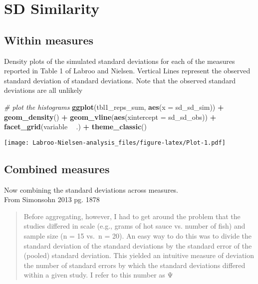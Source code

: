 \documentclass[]{article}
\newenvironment{Shaded}{\begin{snugshade}}{\end{snugshade}}
\newcommand{\CommentTok}[1]{\textcolor[rgb]{0.56,0.35,0.01}{\textit{#1}}}
\newcommand{\DataTypeTok}[1]{\textcolor[rgb]{0.13,0.29,0.53}{#1}}
\newcommand{\KeywordTok}[1]{\textcolor[rgb]{0.13,0.29,0.53}{\textbf{#1}}}
\newcommand{\NormalTok}[1]{#1}
\newcommand{\OperatorTok}[1]{\textcolor[rgb]{0.81,0.36,0.00}{\textbf{#1}}}
\newcommand{\StringTok}[1]{\textcolor[rgb]{0.31,0.60,0.02}{#1}}
\begin{document}
\hypertarget{sd-similarity}{%
\section{SD Similarity}\label{sd-similarity}}

\hypertarget{within-measures}{%
\subsection{Within measures}\label{within-measures}}

Density plots of the simulated standard deviations for each of the
measures reported in Table 1 of Labroo and Nielsen. Vertical Lines
represent the observed standard deviation of standard deviations. Note
that the observed standard deviations are all unlikely

\begin{Shaded}
\begin{Highlighting}[]
\CommentTok{# plot the histograms}
\KeywordTok{ggplot}\NormalTok{(tbl1_reps_sum, }\KeywordTok{aes}\NormalTok{(}\DataTypeTok{x =}\NormalTok{ sd_sd_sim)) }\OperatorTok{+}
\StringTok{  }\KeywordTok{geom_density}\NormalTok{() }\OperatorTok{+}
\StringTok{  }\KeywordTok{geom_vline}\NormalTok{(}\KeywordTok{aes}\NormalTok{(}\DataTypeTok{xintercept =}\NormalTok{ sd_sd_obs)) }\OperatorTok{+}
\StringTok{  }\KeywordTok{facet_grid}\NormalTok{(variable }\OperatorTok{~}\StringTok{ }\NormalTok{.) }\OperatorTok{+}
\StringTok{  }\KeywordTok{theme_classic}\NormalTok{()}
\end{Highlighting}
\end{Shaded}

\texttt{[image: Labroo-Nielsen-analysis\_files/figure-latex/Plot-1.pdf]}

\hypertarget{combined-measures}{%
\subsection{Combined measures}\label{combined-measures}}

Now combining the standard deviations across measures.\\
From Simonsohn 2013 pg. 1878

\begin{quote}
Before aggregating, however, I had to get around the problem that the
studies differed in scale (e.g., grams of hot sauce vs. number of fish)
and sample size (n = 15 vs.~n = 20). An easy way to do this was to
divide the standard deviation of the standard deviations by the standard
error of the (pooled) standard deviation. This yielded an intuitive
measure of deviation the number of standard errors by which the standard
deviations differed within a given study. I refer to this number as Ψ
\end{quote}
\end{document}
